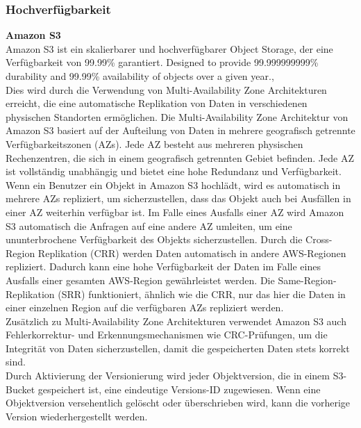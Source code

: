 \newpage

\subsubsection{Hochverfügbarkeit}

\textbf{Amazon S3}\\

Amazon S3 ist ein skalierbarer und hochverfügbarer Object Storage, der eine Verfügbarkeit von 99.99\% garantiert. \glqq Designed to provide 99.999999999\% durability and 99.99\% availability of objects over a given year.\grqq, \cite{aws-availability}\\

Dies wird durch die Verwendung von Multi-Availability Zone Architekturen erreicht, die eine automatische Replikation von Daten in verschiedenen physischen Standorten ermöglichen. Die Multi-Availability Zone Architektur von Amazon S3 basiert auf der Aufteilung von Daten in mehrere geografisch getrennte Verfügbarkeitszonen (AZs). Jede AZ besteht aus mehreren physischen Rechenzentren, die sich in einem geografisch getrennten Gebiet befinden. Jede AZ ist vollständig unabhängig und bietet eine hohe Redundanz und Verfügbarkeit. Wenn ein Benutzer ein Objekt in Amazon S3 hochlädt, wird es automatisch in mehrere AZs repliziert, um sicherzustellen, dass das Objekt auch bei Ausfällen in einer AZ weiterhin verfügbar ist. Im Falle eines Ausfalls einer AZ wird Amazon S3 automatisch die Anfragen auf eine andere AZ umleiten, um eine ununterbrochene Verfügbarkeit des Objekts sicherzustellen. Durch die Cross-Region Replikation (CRR) werden Daten automatisch in andere AWS-Regionen repliziert. Dadurch kann eine hohe Verfügbarkeit der Daten im Falle eines Ausfalls einer gesamten AWS-Region gewährleistet werden. Die Same-Region-Replikation (SRR) funktioniert, ähnlich wie die CRR, nur das hier die Daten in einer einzelnen Region auf die verfügbaren AZs repliziert werden.\\

Zusätzlich zu Multi-Availability Zone Architekturen verwendet Amazon S3 auch Fehlerkorrektur- und Erkennungsmechanismen wie CRC-Prüfungen, um die Integrität von Daten sicherzustellen, damit die gespeicherten Daten stets korrekt sind.\\

Durch Aktivierung der Versionierung wird jeder Objektversion, die in einem S3-Bucket gespeichert ist, eine eindeutige Versions-ID zugewiesen. Wenn eine Objektversion versehentlich gelöscht oder überschrieben wird, kann die vorherige Version wiederhergestellt werden.\\

